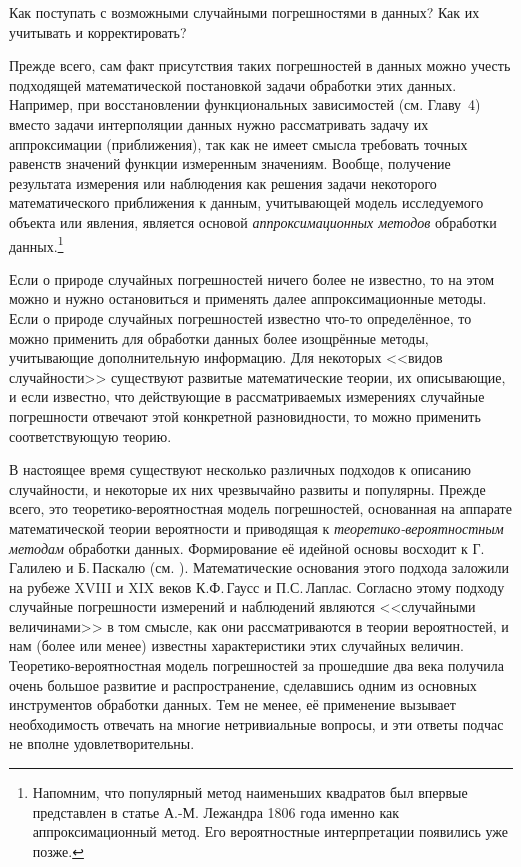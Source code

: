 \documentclass[a5paper,openany]{book}
\begin{document}
Как поступать с возможными случайными погрешностями в данных? Как их учитывать 
и корректировать? 
     
Прежде всего, сам факт присутствия таких погрешностей в данных можно учесть подходящей 
математической постановкой задачи обработки этих данных. Например, при восстановлении 
функциональных зависимостей (см. Главу~4) вместо задачи интерполяции данных нужно 
рассматривать задачу их аппроксимации (приближения), так как не имеет смысла требовать 
точных равенств значений функции измеренным значениям. Вообще, получение результата 
измерения или наблюдения как решения задачи некоторого математического приближения 
к данным, учитывающей модель исследуемого объекта или явления, является основой 
\emph{аппроксимационных методов} обработки данных.\footnote{Напомним, что популярный 
метод наименьших квадратов был впервые представлен в статье А.-М. Лежандра 1806 года 
именно как аппроксимационный метод. Его вероятностные интерпретации появились уже позже.}  
  
Если о природе случайных погрешностей ничего более не известно, то на этом можно 
и нужно остановиться и применять далее аппроксимационные методы. Если о природе 
случайных погрешностей известно что-то определённое, то можно применить для обработки 
данных более изощрённые методы, учитывающие дополнительную информацию. Для некоторых 
<<видов случайности>> существуют развитые математические теории, их описывающие, и 
если известно, что действующие в рассматриваемых измерениях случайные погрешности 
отвечают этой конкретной разновидности, то можно применить соответствующую теорию. 
  
В настоящее время существуют несколько различных подходов к описанию 
случайности, и некоторые их них чрезвычайно развиты и популярны. Прежде всего, 
это теоретико-вероятностная модель погрешностей, основанная на аппарате математической 
теории вероятности и приводящая к \emph{теоретико-вероятностным методам} обработки 
данных. Формирование её идейной основы восходит к Г.\,Галилею и Б.\,Паскалю (см. 
\cite{Maistrov}). Математические основания этого подхода заложили на рубеже XVIII и 
XIX веков К.Ф.\,Гаусс и П.С.\,Лаплас. Согласно этому подходу случайные погрешности 
измерений и наблюдений являются <<случайными величинами>> в том смысле, как они 
рассматриваются в теории вероятностей, и нам (более или менее) известны характеристики 
этих случайных величин. Теоретико-вероятностная модель погрешностей за прошедшие два 
века получила очень большое развитие и распространение, сделавшись одним из основных 
инструментов обработки данных. Тем не менее, её применение вызывает необходимость 
отвечать на многие нетривиальные вопросы, и эти ответы подчас не вполне 
удовлетворительны.               
  
\end{document}
